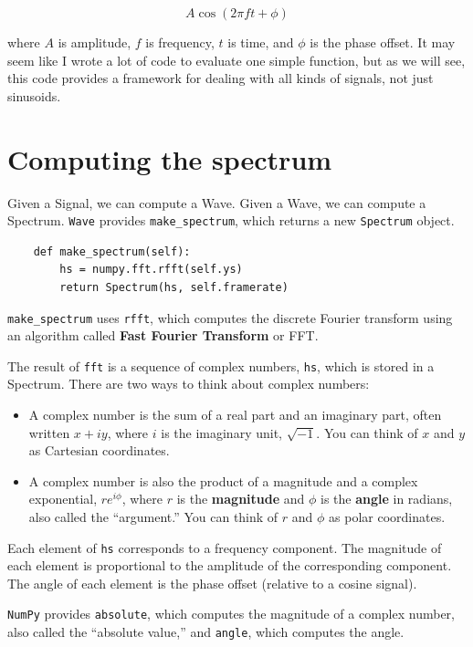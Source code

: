 \documentclass[12pt]{book}
\begin{document}
\[ A \cos (2 \pi f t + \phi) \]

where $A$ is amplitude, $f$ is frequency, $t$ is time, and $\phi$
is the phase offset.  It may seem like I wrote a lot of code
to evaluate one simple function, but as we will see, this code
provides a framework for dealing with all kinds of signals, not
just sinusoids.


\section{Computing the spectrum}

Given a Signal, we can compute a Wave.  Given a Wave, we can compute
a Spectrum.  {\tt Wave} provides \verb"make_spectrum", which returns
a new {\tt Spectrum} object.

\begin{verbatim}
    def make_spectrum(self):
        hs = numpy.fft.rfft(self.ys)
        return Spectrum(hs, self.framerate)
\end{verbatim}

\verb"make_spectrum" uses {\tt rfft}, which computes
the discrete Fourier transform using an algorithm called
{\bf Fast Fourier Transform} or FFT.

The result of {\tt fft} is a sequence of complex numbers, {\tt hs},
which is stored in a Spectrum.  There are two ways to think about
complex numbers:

\begin{itemize}

\item A complex number is the sum of a real part and an imaginary
part, often written $x + iy$, where $i$ is the imaginary unit, $\sqrt{-1}$.
You can think of $x$ and $y$ as Cartesian coordinates.

\item A complex number is also the product of a magnitude
and a complex exponential, $r e^{i \phi}$, where $r$ is the
{\bf magnitude} and $\phi$ is the
{\bf angle} in radians, also called the ``argument.''   You
can think of $r$ and $\phi$ as polar coordinates.

\end{itemize}

Each element of {\tt hs} corresponds to a
frequency component.  The magnitude of each element is proportional
to the amplitude of the corresponding component.
The angle of each element is the phase offset (relative to a cosine
signal).

{\tt NumPy} provides {\tt absolute}, which computes
the magnitude of a complex number, also called the ``absolute value,''
and {\tt angle}, which computes the angle.
\end{document}
